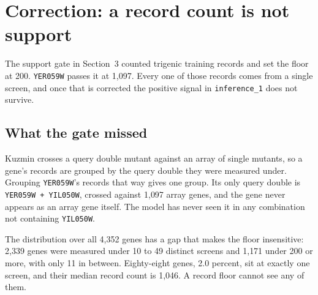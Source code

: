 
\section{Correction: a record count is not support}

The support gate in Section~3 counted trigenic training records and set the floor
at 200. \texttt{YER059W} passes it at 1{,}097. Every one of those records comes
from a single screen, and once that is corrected the positive signal in
\texttt{inference\_1} does not survive.

\subsection{What the gate missed}

Kuzmin crosses a query double mutant against an array of single mutants, so a
gene's records are grouped by the query double they were measured under. Grouping
\texttt{YER059W}'s records that way gives one group. Its only query double is
\texttt{YER059W + YIL050W}, crossed against 1{,}097 array genes, and the gene
never appears as an array gene itself. The model has never seen it in any
combination not containing \texttt{YIL050W}.

The distribution over all 4{,}352 genes has a gap that makes the floor
insensitive: 2{,}339 genes were measured under 10 to 49 distinct screens and
1{,}171 under 200 or more, with only 11 in between. Eighty-eight genes, 2.0
percent, sit at exactly one screen, and their median record count is 1{,}046. A
record floor cannot see any of them.

